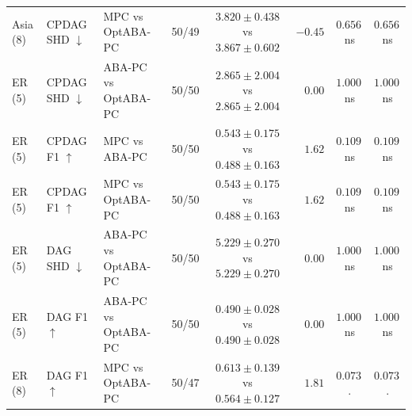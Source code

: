 \begin{table}[t]
{\begin{tabular}{lllrcrcc}
Asia (8) & CPDAG SHD $\downarrow$ & MPC vs OptABA-PC & 50/49 & $3.820\pm0.438$ vs $3.867\pm0.602$ & $-0.45$ & $0.656$\,ns & $0.656$\,ns\\
ER (5) & CPDAG SHD $\downarrow$ & ABA-PC vs OptABA-PC & 50/50 & $2.865\pm2.004$ vs $2.865\pm2.004$ & $0.00$ & $1.000$\,ns & $1.000$\,ns\\
ER (5) & CPDAG F1 $\uparrow$ & MPC vs ABA-PC & 50/50 & $0.543\pm0.175$ vs $0.488\pm0.163$ & $1.62$ & $0.109$\,ns & $0.109$\,ns\\
ER (5) & CPDAG F1 $\uparrow$ & MPC vs OptABA-PC & 50/50 & $0.543\pm0.175$ vs $0.488\pm0.163$ & $1.62$ & $0.109$\,ns & $0.109$\,ns\\
ER (5) & DAG SHD $\downarrow$ & ABA-PC vs OptABA-PC & 50/50 & $5.229\pm0.270$ vs $5.229\pm0.270$ & $0.00$ & $1.000$\,ns & $1.000$\,ns\\
ER (5) & DAG F1 $\uparrow$ & ABA-PC vs OptABA-PC & 50/50 & $0.490\pm0.028$ vs $0.490\pm0.028$ & $0.00$ & $1.000$\,ns & $1.000$\,ns\\
ER (8) & DAG F1 $\uparrow$ & MPC vs OptABA-PC & 50/47 & $0.613\pm0.139$ vs $0.564\pm0.127$ & $1.81$ & $0.073$\,. & $0.073$\,.\\
\bottomrule
\end{tabular}%
}
\end{table}

